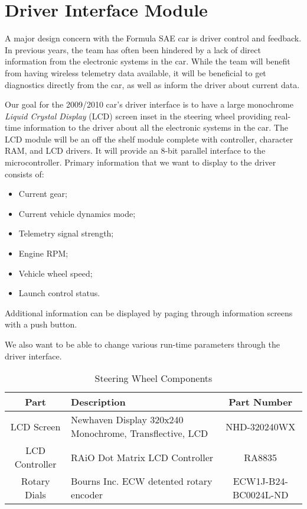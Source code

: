 %
%

\section{Driver Interface Module}

A major design concern with the Formula SAE car is driver control and feedback. In previous years, the team has often been hindered by a lack of direct information from the electronic systems in the car. While the team will benefit from having wireless telemetry data available, it will be beneficial to get diagnostics directly from the car, as well as inform the driver about current data.

Our goal for the 2009/2010 car's driver interface is to have a large monochrome \emph{Liquid Crystal Display} (LCD) screen inset in the steering wheel providing real-time information to the driver about all the electronic systems in the car. The LCD module will be an off the shelf module complete with controller, character RAM, and LCD drivers. It will provide an 8-bit parallel interface to the microcontroller. Primary information that we want to display to the driver consists of:
\begin{itemize}
\item Current gear;
\item Current vehicle dynamics mode;
\item Telemetry signal strength;
\item Engine RPM;
\item Vehicle wheel speed;
\item Launch control status.
\end{itemize}
Additional information can be displayed by paging through information screens with a push button.

We also want to be able to change various run-time parameters through the driver interface.

\begin{table}[H]
\caption{Steering Wheel Components\label{tab:Steering-Wheel-Components}}

\centering{}\begin{tabular}{|c|>{\centering}p{15em}|c|}
\hline 
Part & Description & Part Number\tabularnewline
\hline
\hline 
LCD Screen & Newhaven Display 320x240 Monochrome, Transflective, LCD & NHD-320240WX\tabularnewline
\hline 
LCD Controller & RAiO Dot Matrix LCD Controller & RA8835\tabularnewline
\hline 
Rotary Dials & Bourns Inc. ECW detented rotary encoder & ECW1J-B24-BC0024L-ND\tabularnewline
\hline
\end{tabular}
\end{table}

